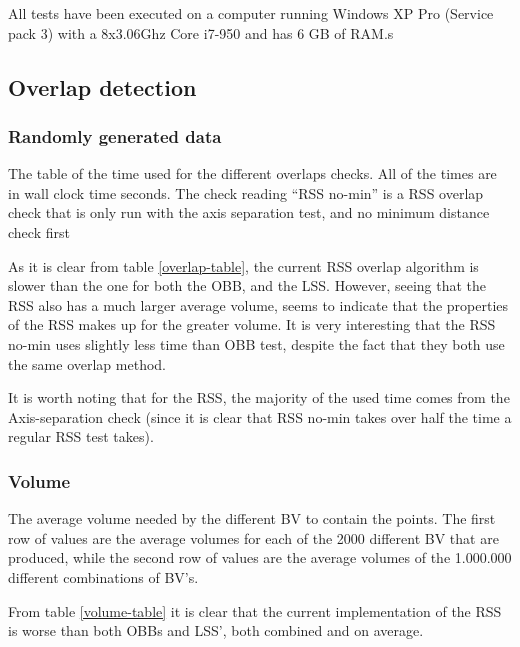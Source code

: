 All tests have been executed on a computer running Windows XP Pro (Service pack 3) with a 8x3.06Ghz Core i7-950 and has 6 GB of RAM.s

\subsection{Overlap detection}

\subsubsection{Randomly generated data}

\begin{table}

\caption{\label{overlap-table}The table of the time used for the
  different overlaps checks. All of the times are in wall clock time seconds. The
  check reading ``RSS no-min'' is a RSS overlap check that is only run
with the axis separation test, and no minimum distance check first}
\end{table}

As it is clear from table \ref{overlap-table}, the current RSS overlap algorithm is slower than the one for both the OBB, and the LSS. However, seeing that the RSS also has a much larger average volume, seems to indicate that the properties of the RSS makes up for the greater volume. It is very interesting that the RSS no-min uses slightly less time than OBB test, despite the fact that they both use the same overlap method. 

It is worth noting that for the RSS, the majority of the used time comes from the Axis-separation check (since it is clear that RSS no-min takes over half the time a regular RSS test takes).

\subsubsection{Volume}
\begin{table}

\caption{\label{volume-table} The average volume needed by the
  different BV to contain the points. The first row of values are the average
  volumes for each of the 2000 different BV that are produced, while
  the second row of values are the average volumes of the 1.000.000
  different combinations of BV's.}
\end{table}

From table \ref{volume-table} it is clear that the current implementation of the RSS is worse than both OBBs and LSS', both combined and on average.

